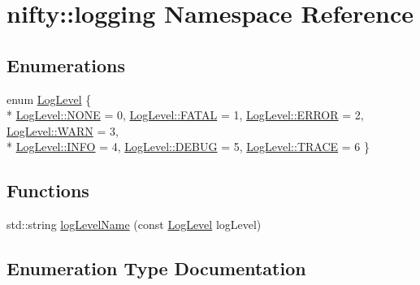 \hypertarget{namespacenifty_1_1logging}{}\section{nifty\+:\+:logging Namespace Reference}
\label{namespacenifty_1_1logging}
\subsection*{Enumerations}
\begin{DoxyCompactItemize}
\item 
enum \hyperlink{namespacenifty_1_1logging_a3385625f9a0dbb17f70c47d3fca2f64d}{Log\+Level} \{ \\*
\hyperlink{namespacenifty_1_1logging_a3385625f9a0dbb17f70c47d3fca2f64dab50339a10e1de285ac99d4c3990b8693}{Log\+Level\+::\+N\+O\+N\+E} = 0, 
\hyperlink{namespacenifty_1_1logging_a3385625f9a0dbb17f70c47d3fca2f64da19da7170bea36556dde582519795f3fc}{Log\+Level\+::\+F\+A\+T\+A\+L} = 1, 
\hyperlink{namespacenifty_1_1logging_a3385625f9a0dbb17f70c47d3fca2f64dabb1ca97ec761fc37101737ba0aa2e7c5}{Log\+Level\+::\+E\+R\+R\+O\+R} = 2, 
\hyperlink{namespacenifty_1_1logging_a3385625f9a0dbb17f70c47d3fca2f64da32bd8a1db2275458673903bdb84cb277}{Log\+Level\+::\+W\+A\+R\+N} = 3, 
\\*
\hyperlink{namespacenifty_1_1logging_a3385625f9a0dbb17f70c47d3fca2f64da551b723eafd6a31d444fcb2f5920fbd3}{Log\+Level\+::\+I\+N\+F\+O} = 4, 
\hyperlink{namespacenifty_1_1logging_a3385625f9a0dbb17f70c47d3fca2f64dadc30ec20708ef7b0f641ef78b7880a15}{Log\+Level\+::\+D\+E\+B\+U\+G} = 5, 
\hyperlink{namespacenifty_1_1logging_a3385625f9a0dbb17f70c47d3fca2f64da2d3e4144aa384b18849ab9a8abad74d6}{Log\+Level\+::\+T\+R\+A\+C\+E} = 6
 \}
\end{DoxyCompactItemize}
\subsection*{Functions}
\begin{DoxyCompactItemize}
\item 
std\+::string \hyperlink{namespacenifty_1_1logging_a71e51d733eeaede804a36fd8dea1a28e}{log\+Level\+Name} (const \hyperlink{namespacenifty_1_1logging_a3385625f9a0dbb17f70c47d3fca2f64d}{Log\+Level} log\+Level)
\end{DoxyCompactItemize}


\subsection{Enumeration Type Documentation}
\hypertarget{namespacenifty_1_1logging_a3385625f9a0dbb17f70c47d3fca2f64d}{}
